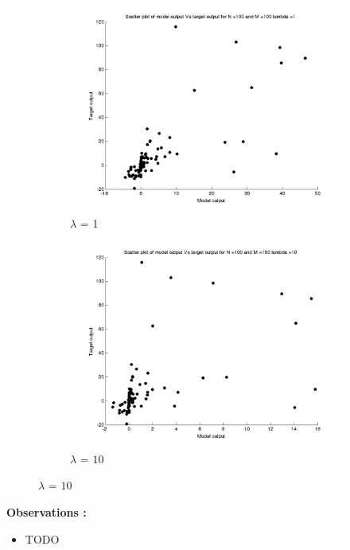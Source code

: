 \documentclass{article}
\begin{document}
\begin{figure}[H]
\begin{subfigure}{.5\textwidth}
\centering
\includegraphics[width=\linewidth]{D2/Scatter/Varyinglambda_N100M100lambda1}
\caption{$\lambda$ = 1}
\end{subfigure}
\begin{subfigure}{.5\textwidth}
\includegraphics[width=\linewidth]{D2/Scatter/Varyinglambda_N100M100lambda10}
\caption{$\lambda$ = $10$}
\end{subfigure}



\end{figure}


\textbf{Observations :}

\begin{itemize}
\item TODO
\end{itemize}
\end{document}
